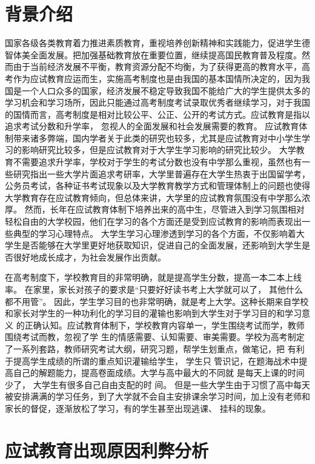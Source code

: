 \documentclass[UTF8]{ctexart}
\begin{document}
\section{背景介绍}
	国家各级各类教育着力推进素质教育，重视培养创新精神和实践能力，促进学生德智体美全面发展。把加强基础教育放在重要位置，继续提高国民教育普及程度。然而由于当前经济发展不平衡，教育资源分配不均衡，为了获得更高的教育水平，高考作为应试教育应运而生，实施高考制度也是由我国的基本国情所决定的，因为我国是一个人口众多的国家，经济发展不稳定导致我国不能给广大的学生提供太多的学习机会和学习场所，因此只能通过高考制度考试录取优秀者继续学习，对于我国的国情而言，高考制度是相对比较公平、公正、公开的考试方式。应试教育是指以追求考试分数和升学率， 忽视人的全面发展和社会发展需要的教育。 应试教育体制带来诸多弊端，国内学者关于此类的研究也较多，尤其是应试教育对中小学生学习的影响研究比较多，但是应试教育对于大学生学习影响的研究比较少。 大学教育不需要追求升学率，学校对于学生的考试分数也没有中学那么重视，虽然也有一些研究指出一些大学片面追求考研率，大学里普遍存在大学生热衷于出国留学考，公务员考试，各种证书考试现象以及大学教育教学方式和管理体制上的问题也使得大学教育存在应试教育倾向，但总体来讲，大学里的应试教育氛围没有中学那么浓厚。 然而，长年在应试教育体制下培养出来的高中生，尽管进入到学习氛围相对轻松自由的大学校园，他们在学习的各个方面还是受到应试教育的影响而表现出一些典型的学习心理特点。 大学生学习心理渗透到学习的各个方面，不仅影响着大学生是否能够在大学里更好地获取知识，促进自己的全面发展，还影响到大学生是否很好地成长成才，为社会发展作出贡献\textsuperscript{\cite{CXF}}。
	\par{在高考制度下，学校教育目的非常明确，就是提高学生分数，提高一本二本上线率。 在家里，家长对孩子的要求是“只要好好读书考上大学就可以了， 其他什么都不用管”。 因此，学生学习目的也非常明确，就是考上大学。这种长期来自学校和家长对学生的一种功利化的学习目的灌输也影响到大学生对于学习目的和学习意义 的正确认知。应试教育体制下，学校教育内容单一，学生围绕考试而学，教师围绕考试而教，忽视了学 生的情感需要、认知需要、审美需要。学校为高考制定了一系列套路，教师研究考试大纲，研究习题，帮学生划重点，做笔记，把 有利于提高学生成绩的所谓的重点知识灌输给学生， 学生只 管识记，在题海战术中提高自己的解题能力，提高卷面成绩。大学与高中最大的不同就 是每天上课的时间少了， 大学生有很多自己自由支配的时 间。 但是一些大学生由于习惯了高中每天被安排满满的学习任务，到了大学就不会自主安排课余学习时间，加上没有老师和家长的督促，逐渐放松了学习，有的学生甚至出现逃课、 挂科的现象。
}
\section{应试教育出现原因利弊分析}
\end{document}

